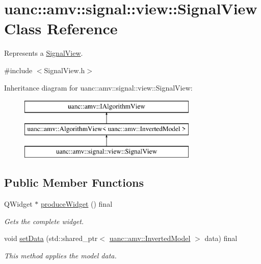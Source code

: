 \hypertarget{classuanc_1_1amv_1_1signal_1_1view_1_1_signal_view}{}\section{uanc\+:\+:amv\+:\+:signal\+:\+:view\+:\+:Signal\+View Class Reference}
\label{classuanc_1_1amv_1_1signal_1_1view_1_1_signal_view}


Represents a \hyperlink{classuanc_1_1amv_1_1signal_1_1view_1_1_signal_view}{Signal\+View}.  




{\ttfamily \#include $<$Signal\+View.\+h$>$}

Inheritance diagram for uanc\+:\+:amv\+:\+:signal\+:\+:view\+:\+:Signal\+View\+:\begin{figure}[H]
\begin{center}
\leavevmode
\includegraphics[height=3.000000cm]{classuanc_1_1amv_1_1signal_1_1view_1_1_signal_view}
\end{center}
\end{figure}
\subsection*{Public Member Functions}
\begin{DoxyCompactItemize}
\item 
Q\+Widget $\ast$ \hyperlink{classuanc_1_1amv_1_1signal_1_1view_1_1_signal_view_a8b42dd84baf3c0730640ddb87db69735}{produce\+Widget} () final
\begin{DoxyCompactList}\small\item\em Gets the complete widget. \end{DoxyCompactList}\item 
void \hyperlink{classuanc_1_1amv_1_1signal_1_1view_1_1_signal_view_a9c7eb492154e043e671549d2c71d94bc}{set\+Data} (std\+::shared\+\_\+ptr$<$ \hyperlink{classuanc_1_1amv_1_1_inverted_model}{uanc\+::amv\+::\+Inverted\+Model} $>$ data) final
\begin{DoxyCompactList}\small\item\em This method applies the model data. \end{DoxyCompactList}\end{DoxyCompactItemize}


